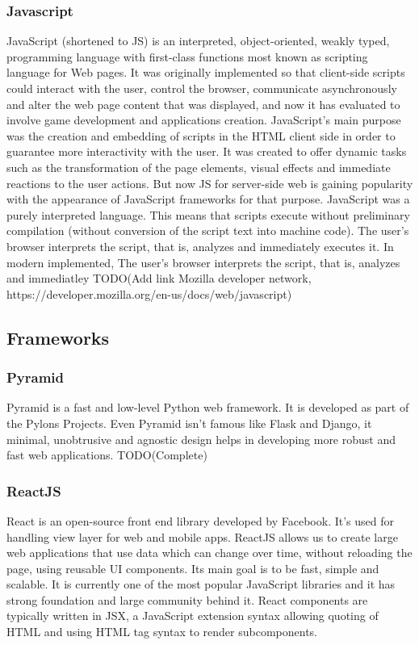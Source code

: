 \subsubsection{Javascript}
JavaScript (shortened to JS) is an interpreted, object-oriented, weakly typed,
programming language with first-class functions most known as scripting language
for Web pages. It was originally implemented so that client-side scripts could
interact with the user, control the browser, communicate asynchronously and
alter the web page content that was displayed, and now it has evaluated to
involve game  development and applications creation. JavaScript's main purpose
was the creation and embedding of scripts in the HTML client side in order to
guarantee more interactivity with the user. It was created to offer dynamic
tasks such as the transformation of the page elements, visual effects and
immediate reactions to the user actions. But now JS for server-side web is
gaining popularity with the appearance of JavaScript frameworks for that
purpose. 
JavaScript was a purely interpreted language. This means that scripts execute
without preliminary compilation (without conversion of the script text into
machine code). The user's browser interprets the script, that is, analyzes and
immediately executes it. In modern implemented, The user's browser interprets
the script, that is, analyzes and immediatley 
TODO(Add link Mozilla developer network, https://developer.mozilla.org/en-us/docs/web/javascript)

\subsection{Frameworks}
\subsubsection{Pyramid}
Pyramid is a fast and low-level Python web framework. It is developed as
part of the Pylons Projects. Even Pyramid isn't famous like Flask and Django, it
minimal, unobtrusive and agnostic design helps in developing more robust and
fast web applications. TODO(Complete) 

\subsubsection{ReactJS}
React is an open-source front end library developed by Facebook. It's used for
handling view layer for web and mobile apps. ReactJS allows us to create large
web applications that use data which can change over time, without reloading the
page, using reusable UI components. Its main goal is to be fast, simple and
scalable. It is currently one of the most popular JavaScript libraries and it
has strong foundation and large community behind it. React components are
typically written in JSX, a JavaScript extension syntax allowing quoting of HTML
and using HTML tag syntax to render subcomponents.

